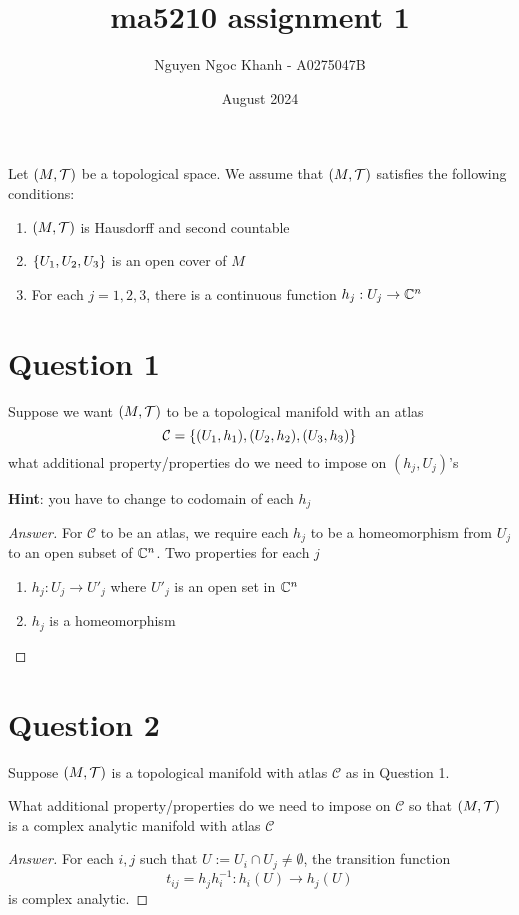 \documentclass{article}
\title{ma5210 assignment 1}
\author{Nguyen Ngoc Khanh - A0275047B}
\date{August 2024}
\begin{document}
\maketitle

Let $(M, \mathcal{T})$ be a topological space. We assume that $(M, \mathcal{T})$ satisfies the following conditions:
\begin{enumerate}
    \item $(M, \mathcal{T})$ is Hausdorff and second countable
    \item $\{U_1, U_2, U_3\}$ is an open cover of $M$
    \item For each $j = 1, 2, 3$, there is a continuous function $h_j: U_j \to \mathbb{C}^n$
\end{enumerate}

\section{Question 1}
Suppose we want $(M, \mathcal{T})$ to be a topological manifold with an atlas 
$$
    \mathcal{C} = \{(U_1, h_1), (U_2, h_2), (U_3, h_3)\}
$$
what additional property/properties do we need to impose on $(h_j, U_j)$'s

\textbf{Hint}: you have to change to codomain of each $h_j$

\begin{proof}[Answer]
    For $\mathcal{C}$ to be an atlas, we require each $h_j$ to be a homeomorphism from $U_j$ to an open subset of $\mathbb{C}^n$. Two properties for each $j$
    \begin{enumerate}
        \item $h_j: U_j \to U'_j$ where $U'_j$ is an open set in $\mathbb{C}^n$
        \item $h_j$ is a homeomorphism
    \end{enumerate}
\end{proof}

\section{Question 2}

Suppose $(M, \mathcal{T})$ is a topological manifold with atlas $\mathcal{C}$ as in Question 1.

What additional property/properties do we need to impose on $\mathcal{C}$ so that $(M, \mathcal{T})$ is a complex analytic manifold with atlas $\mathcal{C}$

\begin{proof}[Answer]
    For each $i, j$ such that $U := U_i \cap U_j \neq \emptyset$, the transition function
    $$
        t_{ij} = h_j h^{-1}_i: h_i(U) \to h_j(U) 
    $$
    is complex analytic.
\end{proof}
\end{document}
